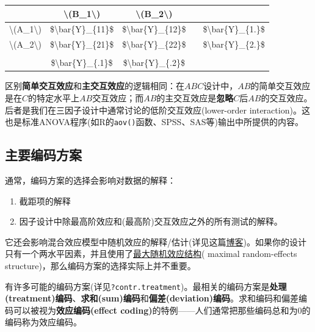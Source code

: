 \documentclass[
]{book}
\providecommand{\tightlist}{%
  \setlength{\itemsep}{0pt}\setlength{\parskip}{0pt}}
\begin{document}
\begin{table}
\centering
\begin{tabular}{c|c|c|c|c}
\hline
 & \textbackslash{}(B\_1\textbackslash{}) & \textbackslash{}(B\_2\textbackslash{}) &  & \\
\hline
\textbackslash{}(A\_1\textbackslash{}) & \$\textbackslash{}bar\{Y\}\_\{11\}\$ & \$\textbackslash{}bar\{Y\}\_\{12\}\$ &  & \$\textbackslash{}bar\{Y\}\_\{1.\}\$\\
\hline
\textbackslash{}(A\_2\textbackslash{}) & \$\textbackslash{}bar\{Y\}\_\{21\}\$ & \$\textbackslash{}bar\{Y\}\_\{22\}\$ &  & \$\textbackslash{}bar\{Y\}\_\{2.\}\$\\
\hline
 &  &  &  & \\
\hline
 & \$\textbackslash{}bar\{Y\}\_\{.1\}\$ & \$\textbackslash{}bar\{Y\}\_\{.2\}\$ &  & \\
\hline
\end{tabular}
\end{table}

区别\textbf{简单交互效应}和\textbf{主交互效应}的逻辑相同：在\(ABC\)设计中，\(AB\)的简单交互效应是在\(C\)的特定水平上\(AB\)交互效应；而\(AB\)的主交互效应是\textbf{忽略}\(C\)后\(AB\)的交互效应。后者是我们在三因子设计中通常讨论的低阶交互效应(lower-order interaction)。这也是标准ANOVA程序(如R的\texttt{aov()}函数、SPSS、SAS等)输出中所提供的内容。

\hypertarget{ux4e3bux8981ux7f16ux7801ux65b9ux6848}{%
\subsection{主要编码方案}\label{ux4e3bux8981ux7f16ux7801ux65b9ux6848}}

通常，编码方案的选择会影响对数据的解释：

\begin{enumerate}
\def\labelenumi{\arabic{enumi}.}
\tightlist
\item
  截距项的解释
\item
  因子设计中除最高阶效应和(最高阶)交互效应之外的所有测试的解释。
\end{enumerate}

它还会影响混合效应模型中随机效应的解释/估计(详见这篇\href{https://talklab.psy.gla.ac.uk/simgen/rsonly.html}{博客})。如果你的设计只有一个两水平因素，并且使用了\href{https://www.sciencedirect.com/science/article/pii/S0749596X12001180}{最大随机效应结构}( maximal random-effects structure)，那么编码方案的选择实际上并不重要。

有许多可能的编码方案(详见\texttt{?contr.treatment})。最相关的编码方案是\textbf{处理(treatment)编码}、\textbf{求和(sum)编码}和\textbf{偏差(deviation)编码}。求和编码和偏差编码可以被视为\textbf{效应编码(effect coding)}的特例------人们通常把那些编码总和为0的编码称为效应编码。
\end{document}
